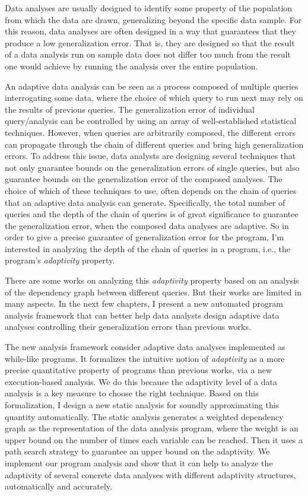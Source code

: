 
Data analyses are usually designed to identify some property of the population 
from which the data are drawn, generalizing beyond the specific data sample. 
For this reason, data analyses are often designed in a way that guarantees that they produce a low generalization error.
That is, they are designed so that the result of a data analysis run on sample data does not differ too much from the result one would achieve by running the analysis over the entire population. 

An adaptive data analysis can be seen as a process composed of multiple queries interrogating some data, where the choice of which query to run next may rely on the results of previous queries. 
The generalization error of individual query/analysis can be controlled by using an array of well-established statistical techniques.
However, when queries are arbitrarily composed, the different errors can propagate through the chain of different queries and bring high generalization errors. 
To address this issue, data analysts are designing several techniques that not only guarantee bounds on the generalization errors of single queries, but also guarantee bounds on the generalization error of the composed analyses. 
The choice of which of these techniques to use, 
often depends on the chain of queries that an adaptive data analysis can generate.
Specifically, the total number of queries and the depth of the chain of queries is of great significance 
to guarantee the generalization error, 
when the composed data analyses are adaptive. 
So in order to give a precise guarantee of generalization error
for the program,
I'm interested in analyzing the depth of the chain of queries in a program, i.e., the program's \emph{adaptivity} property.

There are some works on analyzing this \emph{adaptivity} property based on an analysis of the dependency graph between different queries.
But their works are limited in many aspects.
In the next few chapters,
I present a new automated program analysis framework that can better help data analysts
design adaptive data analyses controlling their generalization errors than previous works.

The new analysis framework consider adaptive data analyses implemented as while-like programs.
It formalizes the intuitive notion of \emph{adaptivity} as a
more precise quantitative property of programs than previous works, via a new
execution-based analysis.
We do this because the adaptivity level of a data analysis is a key measure to choose the right technique. 
Based on this formalization, I design a new static analysis for soundly approximating this quantity automatically.
The static analysis generates a weighted dependency graph as the representation of the data analysis program,
where the weight is an upper bound on the number of times each variable can be reached.
Then it uses a path search strategy to guarantee an upper bound on the adaptivity. 
We implement our program analysis and show that it can help to analyze the adaptivity of several
concrete data analyses with different adaptivity structures, automatically and accurately.

